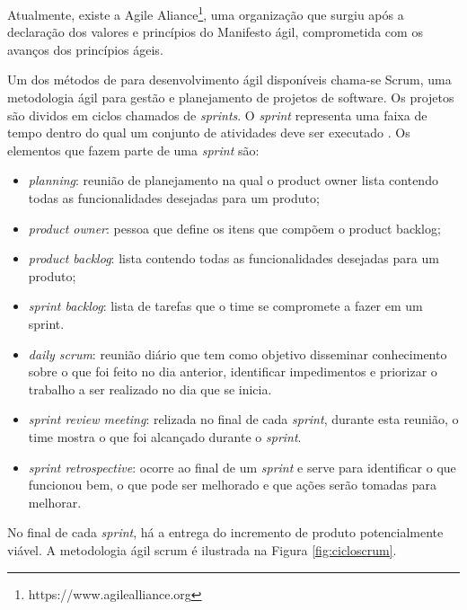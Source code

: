  Atualmente, existe a Agile Aliance\footnote{https://www.agilealliance.org}, uma organização que surgiu após a declaração dos valores e princípios do Manifesto ágil, comprometida com os avanços dos princípios ágeis. 

Um dos métodos de para desenvolvimento ágil disponíveis chama-se Scrum, uma metodologia ágil para gestão e planejamento de projetos de software. Os projetos são dividos em ciclos chamados de \textit{sprints}. O \textit{sprint} representa uma faixa de tempo dentro do qual um conjunto de atividades deve ser executado \cite{scrum}. Os elementos que fazem parte de uma \textit{sprint} são:

\begin{itemize}
\item \textit{planning}: reunião de planejamento na qual o product owner lista contendo todas as funcionalidades desejadas para um produto;

\item \textit{product owner}: pessoa que define os itens que compõem o product backlog;

\item \textit{product backlog}: lista contendo todas as funcionalidades desejadas para um produto;

\item \textit{sprint backlog}: lista de tarefas que o time se compromete a fazer em um sprint.

\item \textit{daily scrum}: reunião diário que tem como objetivo disseminar conhecimento sobre o que foi feito no dia anterior, identificar impedimentos e priorizar o trabalho a ser realizado no dia que se inicia.

\item \textit{sprint review meeting}: relizada no final de cada \textit{sprint}, durante esta reunião, o time mostra o que foi alcançado durante o \textit{sprint}. 

\item \textit{sprint retrospective}: ocorre ao final de um \textit{sprint} e serve para identificar o que funcionou bem, o que pode ser melhorado e que ações serão tomadas para melhorar.

\end{itemize}

No final de cada \textit{sprint}, há a entrega do incremento de produto potencialmente viável. A metodologia ágil scrum é ilustrada na Figura \ref{fig:cicloscrum}.

